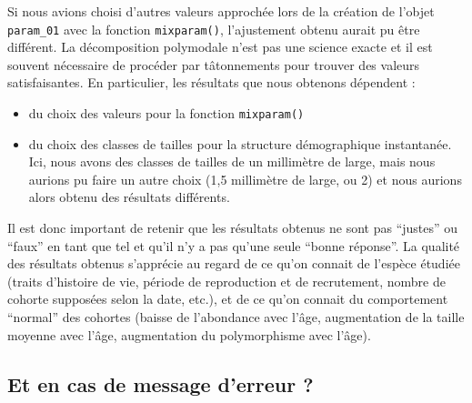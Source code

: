 \documentclass[
  a4paper,
  DIV=11,
  numbers=noendperiod,
  oneside]{scrreprt}
\providecommand{\tightlist}{%
  \setlength{\itemsep}{0pt}\setlength{\parskip}{0pt}}\usepackage{longtable,booktabs,array}
\begin{document}
\begin{tcolorbox}[enhanced jigsaw, breakable, toprule=.15mm, colbacktitle=quarto-callout-important-color!10!white, colframe=quarto-callout-important-color-frame, arc=.35mm, bottomtitle=1mm, opacityback=0, title=\textcolor{quarto-callout-important-color}{\faExclamation}\hspace{0.5em}{De l'importance du choix des valeurs initiales}, bottomrule=.15mm, colback=white, toptitle=1mm, rightrule=.15mm, leftrule=.75mm, opacitybacktitle=0.6, left=2mm, titlerule=0mm, coltitle=black]

Si nous avions choisi d'autres valeurs approchée lors de la création de
l'objet \texttt{param\_01} avec la fonction \texttt{mixparam()},
l'ajustement obtenu aurait pu être différent. La décomposition
polymodale n'est pas une science exacte et il est souvent nécessaire de
procéder par tâtonnements pour trouver des valeurs satisfaisantes. En
particulier, les résultats que nous obtenons dépendent :

\begin{itemize}
\tightlist
\item
  du choix des valeurs pour la fonction \texttt{mixparam()}
\item
  du choix des classes de tailles pour la structure démographique
  instantanée. Ici, nous avons des classes de tailles de un millimètre
  de large, mais nous aurions pu faire un autre choix (1,5 millimètre de
  large, ou 2) et nous aurions alors obtenu des résultats différents.
\end{itemize}

Il est donc important de retenir que les résultats obtenus ne sont pas
``justes'' ou ``faux'' en tant que tel et qu'il n'y a pas qu'une seule
``bonne réponse''. La qualité des résultats obtenus s'apprécie au regard
de ce qu'on connait de l'espèce étudiée (traits d'histoire de vie,
période de reproduction et de recrutement, nombre de cohorte supposées
selon la date, etc.), et de ce qu'on connait du comportement ``normal''
des cohortes (baisse de l'abondance avec l'âge, augmentation de la
taille moyenne avec l'âge, augmentation du polymorphisme avec l'âge).

\end{tcolorbox}

\hypertarget{et-en-cas-de-message-derreur}{%
\subsection{Et en cas de message d'erreur
?}\label{et-en-cas-de-message-derreur}}
\end{document}
